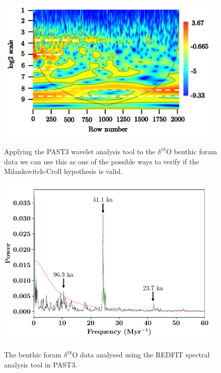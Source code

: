 \documentclass[12pt, onecolumn]{revtex4}    %
\begin{document}
\begin{figure}[!h]
\begin{center}
\includegraphics[width=11cm]{figures/wa_d18O.pdf}
\caption[]{Applying the PAST3 wavelet analysis tool to the $\delta^{18}$O benthic foram data we can use this as one of the possible ways to verify if the Milankovitch-Croll hypothesis is valid.}
\vspace{-3ex}
\label{fig:wa_d18o}
\end{center}
\end{figure}

\begin{figure}[!h]
\begin{center}
\includegraphics[width=11cm]{figures/d18O_redfit}
\caption[]{The benthic foram $\delta^{18}$O data analysed using the REDFIT spectral analysis tool in PAST3.}
\vspace{-3ex}
\label{fig:d18o_redfit}
\end{center}
\end{figure}
\end{document}
